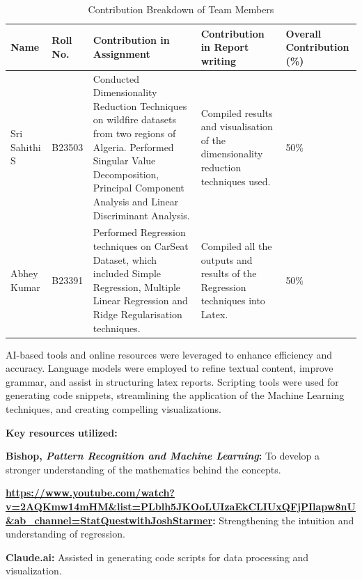 \documentclass[12pt]{article}
\begin{document}
\begin{table}[h]
    \centering
    \renewcommand{\arraystretch}{1.5} %
    \setlength{\tabcolsep}{6pt} %
    \begin{tabular}{|l|l|p{4cm}|p{4cm}|p{3.5cm}|}
        \hline
        \textbf{Name} & \textbf{Roll No.} & \textbf{Contribution in Assignment} & \textbf{Contribution in Report writing} & \textbf{Overall Contribution (\%)} \\ 
        \hline
        Sri Sahithi S & B23503 & Conducted Dimensionality Reduction Techniques on wildfire datasets from two regions of Algeria. Performed Singular Value Decomposition, Principal Component Analysis and Linear Discriminant Analysis. & Compiled results and visualisation of the dimensionality reduction techniques used.& 50\% \\ 
        \hline
        Abhey Kumar & B23391 & Performed Regression techniques on CarSeat Dataset, which included Simple Regression, Multiple Linear Regression and Ridge Regularisation techniques. &  Compiled all the outputs and results of the Regression techniques into Latex.  & 50\% \\ 
        \hline
    \end{tabular}
    \caption{Contribution Breakdown of Team Members}
\end{table}


AI-based tools and online resources were leveraged to enhance efficiency and accuracy. Language models were employed to refine textual content, improve grammar, and assist in structuring latex reports. Scripting tools were used for generating code snippets, streamlining the application of the Machine Learning techniques, and creating compelling visualizations.

\textbf{Key resources utilized:} 

\textbf{Bishop, \textit{Pattern Recognition and Machine Learning}:} To develop a stronger understanding of the mathematics behind the concepts.

\textbf{\url{https://www.youtube.com/watch?v=2AQKmw14mHM&list=PLblh5JKOoLUIzaEkCLIUxQFjPIlapw8nU&ab_channel=StatQuestwithJoshStarmer}:} Strengthening the intuition and understanding of regression.

\textbf{Claude.ai:} Assisted in generating code scripts for data processing and visualization.
\end{document}
